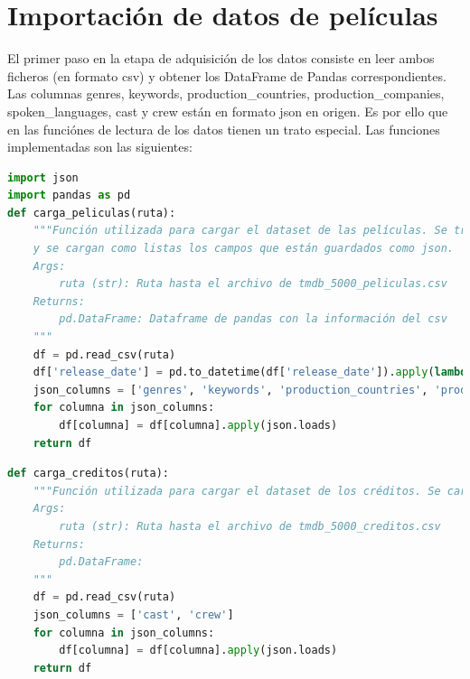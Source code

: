 \newpage
\section{Importación de datos de películas}

El primer paso en la etapa de adquisición de los datos consiste en leer ambos ficheros (en formato csv) y obtener los DataFrame de Pandas correspondientes. Las columnas genres, keywords, production\_countries, production\_companies, spoken\_languages, cast y crew están en formato json en origen. Es por ello que en las funciónes de lectura de los datos tienen un trato especial. Las funciones implementadas son las siguientes:

\begin{lstlisting}[language=Python, caption={Lectura de los datos del fichero de películas. Se carga el fichero desde la ruta y se mapea la fecha de lanzamiento a un objeto de tipo fecha. Algunas de las columnas de entrada están en formato JSON, por lo que se cargan como JSON en vez de como texto plano para poder trabajar con ellas.}]
import json
import pandas as pd
def carga_peliculas(ruta):
    """Función utilizada para cargar el dataset de las películas. Se transforma a fecha el campo de fecha de salida
    y se cargan como listas los campos que están guardados como json.
    Args:
        ruta (str): Ruta hasta el archivo de tmdb_5000_peliculas.csv
    Returns:
        pd.DataFrame: Dataframe de pandas con la información del csv
    """
    df = pd.read_csv(ruta)
    df['release_date'] = pd.to_datetime(df['release_date']).apply(lambda x: x.date())
    json_columns = ['genres', 'keywords', 'production_countries', 'production_companies', 'spoken_languages']
    for columna in json_columns:
        df[columna] = df[columna].apply(json.loads)
    return df
\end{lstlisting}

\begin{lstlisting}[language=Python, caption={Lectura de los datos del fichero de créditos. Se carga el fichero desde la ruta dada. Para las columnas que están en formato tipo JSON, es interesante cargarlas como un JSON para tener un diccionario de Python en vez de un campo con el JSON como texto plano.}]
def carga_creditos(ruta):
    """Función utilizada para cargar el dataset de los créditos. Se cargan como listas los campos que están guardado
    Args:
        ruta (str): Ruta hasta el archivo de tmdb_5000_creditos.csv
    Returns:
        pd.DataFrame:
    """
    df = pd.read_csv(ruta)
    json_columns = ['cast', 'crew']
    for columna in json_columns:
        df[columna] = df[columna].apply(json.loads)
    return df
\end{lstlisting}

